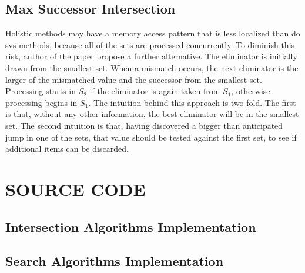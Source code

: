 \documentclass[paper=a4, fontsize=11pt]{scrartcl} %
\numberwithin{equation}{section} %
\numberwithin{figure}{section} %
\numberwithin{table}{section} %
\begin{document}
\subsection{Max Successor Intersection}

Holistic methods may have a memory access pattern that is less localized than do svs methods, because all of the sets are processed concurrently. To diminish this risk, author of the paper propose a further alternative. The eliminator is initially drawn from the smallest set. When a mismatch occurs, the next eliminator is the larger of the mismatched value and the successor from the smallest set. Processing starts in $S_{2}$ if the eliminator is again taken from $S_{1}$, otherwise processing begins in $S_{1}$. The intuition behind this approach is two-fold. The first is that, without any other information, the best eliminator will be in the smallest set. The second intuition is that, having discovered a bigger than anticipated jump in one of the sets, that value should be tested against the first set, to see if additional items can be discarded.

\newpage
\section{SOURCE CODE}
\subsection{Intersection Algorithms Implementation}


\newpage
\subsection{Search Algorithms Implementation}

\end{document}
